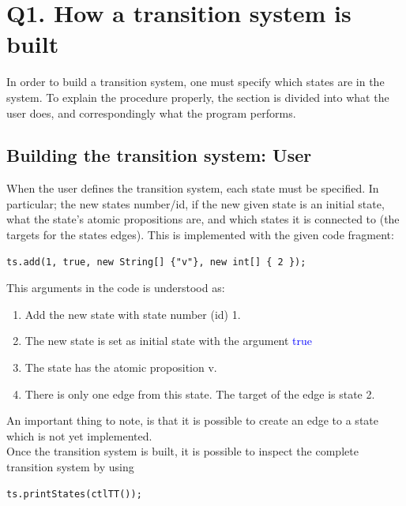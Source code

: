 \section{Q1. How a transition system is built}
\label{sec:Q1}

In order to build a transition system, one must specify which states are in the system. To explain the procedure properly, the section is divided into what the user does, and correspondingly what the program performs.

\subsection{Building the transition system: User}

When the user defines the transition system, each state must be specified. In particular; the new states number/id, if the new given state is an initial state, what the state's atomic propositions are, and which states it is connected to (the targets for the states edges). This is implemented with the given code fragment:

\begin{lstlisting}
ts.add(1, true, new String[] {"v"}, new int[] { 2 });
\end{lstlisting}

This arguments in the code is understood as:
\begin{enumerate}
\item Add the new state with state number (id) 1. 
\item The new state is set as initial state with the argument \textcolor{blue}{true}
\item The state has the atomic proposition \textsf{v}.
\item There is only one edge from this state. The target of the edge is state 2.
\end{enumerate}

An important thing to note, is that it is possible to create an edge to a state which is not yet implemented. \\

Once the transition system is built, it is possible to inspect the complete transition system by using
\begin{lstlisting}
ts.printStates(ctlTT());
\end{lstlisting}


